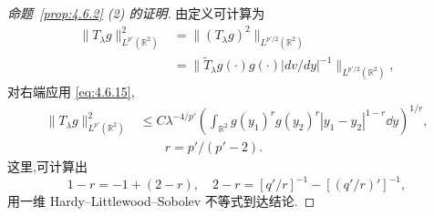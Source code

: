 \begin{proof}[命题~\ref{prop:4.6.2} (2) 的证明]
由定义可计算为
\begin{equation}
\begin{aligned}
\|T_{\lambda}g\|_{L^{p'}(\mathbb{R}^{2})}^{2} & = \|(T_{\lambda}g)^{2}\|_{L^{p'/2}(\mathbb{R}^{2})} \\
& = \|\tilde{T}_{\lambda}g(\cdot)g(\cdot)|dv/dy|^{-1}\|_{L^{p'/2}(\mathbb{R}^{2})},
\end{aligned}
\end{equation}
对右端应用 \eqref{eq:4.6.15},
\begin{equation}
\begin{aligned}
\|T_{\lambda}g\|_{L^{p'}(\mathbb{R}^{2})}^{2} & \leq C\lambda^{-4/p'}\left(\int_{\mathbb{R}^{2}}g(y_{1})^{r}g(y_{2})^{r}|y_{1} - y_{2}|^{1-r}\dd y\right)^{1/r}, \\
& \qquad r = p'/(p' - 2).
\end{aligned}
\end{equation}
这里,可计算出
\begin{equation*}
1 - r = -1 + (2 - r), \quad 2 - r = [q'/r]^{-1} - [(q'/r)']^{-1},
\end{equation*}
用一维 Hardy--Littlewood--Sobolev 不等式到达结论.
\end{proof}
